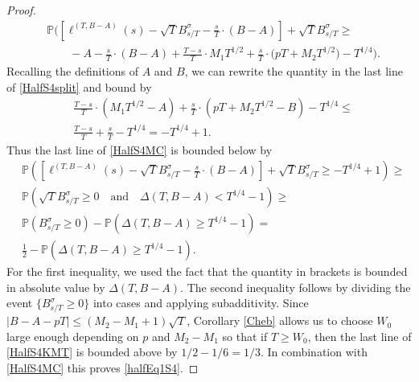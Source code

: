 \begin{proof}
\begin{equation}
\begin{split}
	& \mathbb{P}\bigg( \left[\ell^{(T,B-A)}(s) - \sqrt{T} B^\sigma_{s/T} - \frac{s}{T}\cdot(B-A)\right] + \sqrt{T}B^\sigma_{s/T} \geq \\
	&\qquad -A-\frac{s}{T}\cdot(B-A) +\frac{T-s}{T} \cdot M_1 T^{1/2} + \frac{s}{T} \cdot \big(p T + M_2 T^{1/2}\big) - T^{1/4} \bigg).
	\end{split}
	\end{equation}
	Recalling the definitions of $A$ and $B$, we can rewrite the quantity in the last line of \eqref{HalfS4split} and bound by
	\begin{align*}
	&\frac{T-s}{T}\cdot(M_1T^{1/2}-A) + \frac{s}{T}\cdot(pT + M_2T^{1/2} - B) - T^{1/4} \leq \\
	& \frac{T-s}{T} + \frac{s}{T} - T^{1/4} = -T^{1/4} + 1.
	\end{align*}
	Thus the last line of \eqref{HalfS4MC} is bounded below by
	\begin{equation}\label{HalfS4KMT}
	\begin{split}
	& \mathbb{P}\left( \left[\ell^{(T,B-A)}(s) - \sqrt{T} B^\sigma_{s/T} - \frac{s}{T}\cdot(B-A)\right] + \sqrt{T}B^\sigma_{s/T} \geq -T^{1/4} + 1 \right) \geq\\
	& \mathbb{P}\left( \sqrt{T}B^\sigma_{s/T} \geq 0 \quad \mathrm{and} \quad \Delta(T,B-A) < T^{1/4} - 1 \right) \geq\\
	& \mathbb{P}\left( B^\sigma_{s/T} \geq 0 \right) - \mathbb{P}\left( \Delta(T,B-A) \geq T^{1/4} - 1 \right) =\\
	& \frac{1}{2} - \mathbb{P}\left( \Delta(T,B-A) \geq T^{1/4} - 1 \right).
	\end{split}
	\end{equation}
	For the first inequality, we used the fact that the quantity in brackets is bounded in absolute value by $\Delta(T,B-A)$. The second inequality follows by dividing the event $\{B^\sigma_{s/T}\geq 0\}$ into cases and applying subadditivity. Since $|B-A-pT|\leq (M_2-M_1+1)\sqrt{T}$, Corollary \ref{Cheb} allows us to choose $W_0$ large enough depending on $p$ and $M_2-M_1$ so that if $T \geq W_0$, then the last line of \eqref{HalfS4KMT} is bounded above by $1/2 - 1/6 = 1/3$. In combination with \eqref{HalfS4MC} this proves \eqref{halfEq1S4}.
\end{proof}

